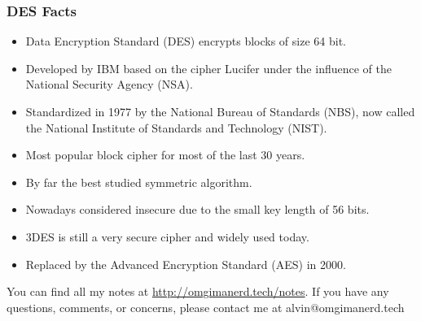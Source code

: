 \documentclass{math}
\begin{document}
\subsubsection*{DES Facts}
\begin{itemize}
  \item Data Encryption Standard (DES) encrypts blocks of size 64 bit.
  \item Developed by IBM based on the cipher Lucifer under the influence of the
  National Security Agency (NSA).
  \item Standardized in 1977 by the National Bureau of Standards (NBS), now
  called the National Institute of Standards and Technology (NIST).
  \item Most popular block cipher for most of the last 30 years.
  \item By far the best studied symmetric algorithm.
  \item Nowadays considered insecure due to the small key length of 56 bits.
  \item 3DES is still a very secure cipher and widely used today.
  \item Replaced by the Advanced Encryption Standard (AES) in 2000.
\end{itemize}

\begin{center}
  You can find all my notes at \url{http://omgimanerd.tech/notes}. If you have
  any questions, comments, or concerns, please contact me at
  alvin@omgimanerd.tech
\end{center}
\end{document}
